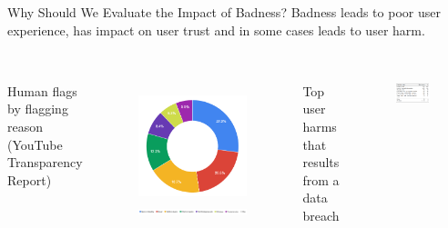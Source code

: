 \documentclass[nobackground,dvipsnames,table,aspectratio=169]{beamer}
\begin{document}
\begin{frame}{Why Should We Evaluate the Impact of Badness?}
    \centering
    Badness leads to poor user experience, has impact on user trust and in some cases leads to user harm.\\~\\
    \begin{columns}[T]
            \centering
            \small{Human flags by flagging reason (YouTube Transparency Report)}
            \begin{figure}
                \includegraphics[width=\textwidth]{youtube-reports}
                \includegraphics[width=1.5\textwidth]{youtube-reports-key}
            \end{figure}
            \centering
            \small{Top user harms that results from a data breach}
            \begin{figure}
                \includegraphics[width=\textwidth]{potential-harms}
            \end{figure}
    \end{columns}
\end{frame}
\end{document}
